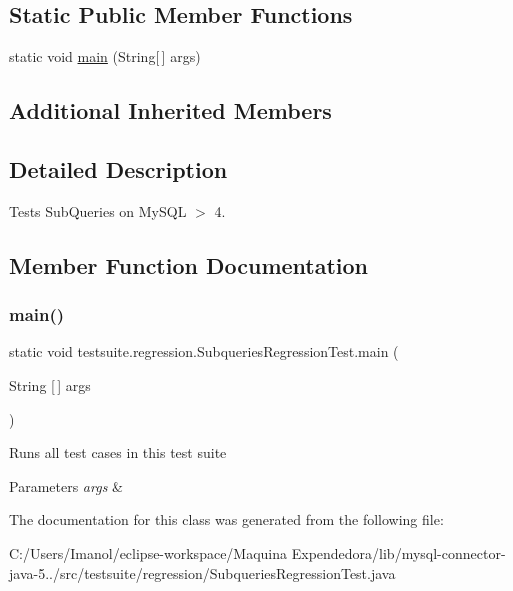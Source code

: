 \subsection*{Static Public Member Functions}
\begin{DoxyCompactItemize}
\item 
static void \mbox{\hyperlink{classtestsuite_1_1regression_1_1_subqueries_regression_test_a12104698d6c112af5a803f335cce6b97}{main}} (String\mbox{[}$\,$\mbox{]} args)
\end{DoxyCompactItemize}
\subsection*{Additional Inherited Members}


\subsection{Detailed Description}
Tests Sub\+Queries on My\+S\+QL $>$ 4. 

\subsection{Member Function Documentation}
\mbox{\label{classtestsuite_1_1regression_1_1_subqueries_regression_test_a12104698d6c112af5a803f335cce6b97}} 
\subsubsection{\texorpdfstring{main()}{main()}}
{\footnotesize\ttfamily static void testsuite.\+regression.\+Subqueries\+Regression\+Test.\+main (\begin{DoxyParamCaption}\item[{String \mbox{[}$\,$\mbox{]}}]{args }\end{DoxyParamCaption})\hspace{0.3cm}{\ttfamily [static]}}

Runs all test cases in this test suite


\begin{DoxyParams}{Parameters}
{\em args} & \\
\hline
\end{DoxyParams}


The documentation for this class was generated from the following file\+:\begin{DoxyCompactItemize}
\item 
C\+:/\+Users/\+Imanol/eclipse-\/workspace/\+Maquina Expendedora/lib/mysql-\/connector-\/java-\/5../src/testsuite/regression/Subqueries\+Regression\+Test.\+java\end{DoxyCompactItemize}
